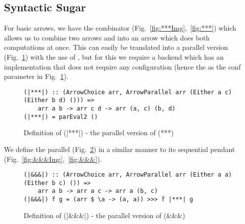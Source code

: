 \subsection{Syntactic Sugar} \label{syntacticSugar}
For basic arrows, we have the \code{(***)} combinator (Fig.~\ref{fig:***Img},~\ref{fig:***}) which allows us to combine two arrows  and  into an arrow  which does both computations at once. This can easily be translated into a parallel version \code{(|***|)} (Fig.~\ref{fig:|***|}) with the use of , but for this we require a backend which has an implementation that does not require any configuration (hence the \code{()} as the conf parameter in Fig.~\ref{fig:|***|}).
\begin{figure}[h]
\begin{lstlisting}[frame=htrbl]
(|***|) :: (ArrowChoice arr, ArrowParallel arr (Either a c) (Either b d) ())) =>
	arr a b -> arr c d -> arr (a, c) (b, d)
(|***|) = parEval2 ()
\end{lstlisting}
\caption{Definition of (|***|) - the parallel version of (***)}
\label{fig:|***|}
\end{figure}
We define the parallel \code{(|&&&|)} (Fig.~\ref{fig:|&&&|}) in a similar manner to its sequential pendant \code{(&&&)} (Fig.~\ref{fig:&&&Img},~\ref{fig:&&&}).
\begin{figure}[h]
\begin{lstlisting}[frame=htrbl]
(|&&&|) :: (ArrowChoice arr, ArrowParallel arr (Either a a) (Either b c) ()) =>
	arr a b -> arr a c -> arr a (b, c)
(|&&&|) f g = (arr $ \a -> (a, a)) >>> f |***| g
\end{lstlisting} %
\caption{Definition of (|\&\&\&|) - the parallel version of (\&\&\&)}
\label{fig:|&&&|}
\end{figure}